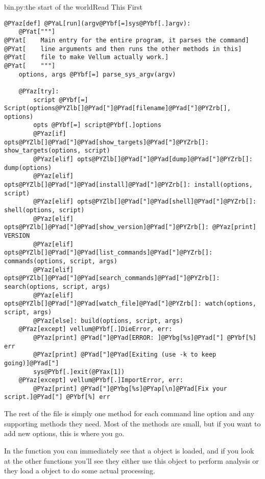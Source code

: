\begin{code}{bin.py:the start of the world}{Read This First}
\begin{Verbatim}[commandchars=@\[\]]
@PYaz[def] @PYaL[run](argv@PYbf[=]sys@PYbf[.]argv):
    @PYat["""]
@PYat[    Main entry for the entire program, it parses the command]
@PYat[    line arguments and then runs the other methods in this]
@PYat[    file to make Vellum actually work.]
@PYat[    """]
    options, args @PYbf[=] parse_sys_argv(argv)

    @PYaz[try]:
        script @PYbf[=] Script(options@PYZlb[]@PYad["]@PYad[filename]@PYad["]@PYZrb[], options)
        opts @PYbf[=] script@PYbf[.]options
        @PYaz[if] opts@PYZlb[]@PYad["]@PYad[show_targets]@PYad["]@PYZrb[]: show_targets(options, script)
        @PYaz[elif] opts@PYZlb[]@PYad["]@PYad[dump]@PYad["]@PYZrb[]: dump(options)
        @PYaz[elif] opts@PYZlb[]@PYad["]@PYad[install]@PYad["]@PYZrb[]: install(options, script)
        @PYaz[elif] opts@PYZlb[]@PYad["]@PYad[shell]@PYad["]@PYZrb[]: shell(options, script)
        @PYaz[elif] opts@PYZlb[]@PYad["]@PYad[show_version]@PYad["]@PYZrb[]: @PYaz[print] VERSION
        @PYaz[elif] opts@PYZlb[]@PYad["]@PYad[list_commands]@PYad["]@PYZrb[]: commands(options, script, args)
        @PYaz[elif] opts@PYZlb[]@PYad["]@PYad[search_commands]@PYad["]@PYZrb[]: search(options, script, args)
        @PYaz[elif] opts@PYZlb[]@PYad["]@PYad[watch_file]@PYad["]@PYZrb[]: watch(options, script, args)
        @PYaz[else]: build(options, script, args)
    @PYaz[except] vellum@PYbf[.]DieError, err:
        @PYaz[print] @PYad["]@PYad[ERROR: ]@PYbg[%s]@PYad["] @PYbf[%] err
        @PYaz[print] @PYad["]@PYad[Exiting (use -k to keep going)]@PYad["]
        sys@PYbf[.]exit(@PYax[1])
    @PYaz[except] vellum@PYbf[.]ImportError, err:
        @PYaz[print] @PYad["]@PYbg[%s]@PYap[\n]@PYad[Fix your script.]@PYad["] @PYbf[%] err
\end{Verbatim}

\end{code}

The rest of the file is simply one method for each command line option and any
supporting methods they need.  Most of the methods are small, but if you want to
add new options, this is where you go.

In the  function you can immediately see that a  object
is loaded, and if you look at the other functions you'll see they either use
this  object to perform analysis or they load a 
object to do some actual processing.

